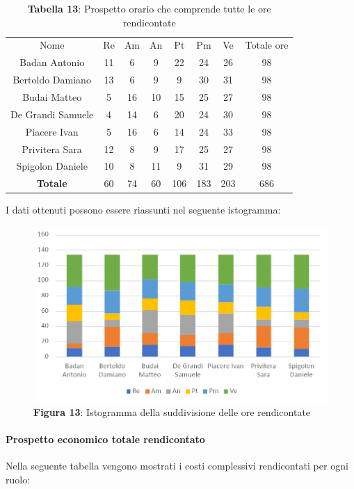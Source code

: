 \begin{table}[H]
	\centering
	\renewcommand{\arraystretch}{1.5}
	\begin{tabular}{|c|c|c|c|c|c|c|c|}
		\hline
		\rowcolor{lighter-grayer}
		Nome & Re & Am & An & Pt & Pm & Ve & Totale ore\\
Badan Antonio     & 11 & 6  & 9  & 22  & 24  & 26  & 98  \\ \hline
Bertoldo Damiano  & 13 & 6  & 9  & 9   & 30  & 31  & 98  \\ \hline
Budai Matteo      & 5  & 16 & 10 & 15  & 25  & 27  & 98  \\ \hline
De Grandi Samuele & 4  & 14 & 6  & 20  & 24  & 30  & 98  \\ \hline
Piacere Ivan      & 5  & 16 & 6  & 14  & 24  & 33  & 98  \\ \hline
Privitera Sara    & 12 & 8  & 9  & 17  & 25  & 27  & 98  \\ \hline
Spigolon Daniele  & 10 & 8  & 11 & 9   & 31  & 29  & 98  \\ \hline
\textbf{Totale}   & 60 & 74 & 60 & 106 & 183 & 203 & 686 \\ \hline
	\end{tabular}
	\caption*{\textbf{Tabella 13}: Prospetto orario che comprende tutte le ore rendicontate\\}
\end{table}	
I dati ottenuti possono essere riassunti nel seguente istogramma:

\begin{figure}[H]
	\centering
	\includegraphics[width=0.7\linewidth]{res/images/IstogrammaTotaleRendicontato.png}
	\caption*{\textbf{Figura 13}: Istogramma della suddivisione delle ore rendicontate}
	\label{fig:Figura10}
\end{figure}

\paragraph{Prospetto economico totale rendicontato}
Nella seguente tabella vengono mostrati i costi complessivi rendicontati per ogni ruolo:


